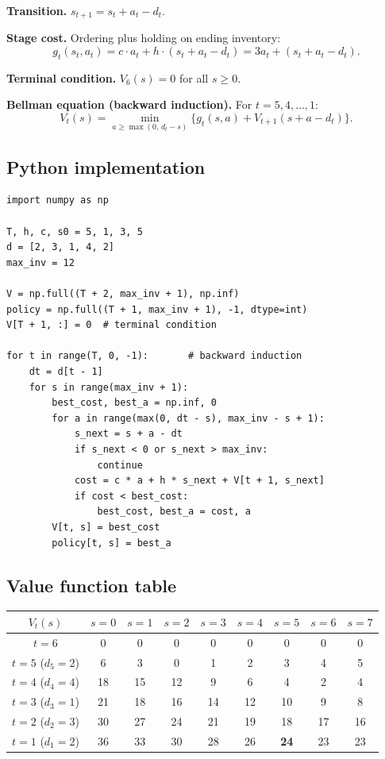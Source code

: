 \documentclass[12pt]{article}
\begin{document}
\textbf{Transition.} $s_{t+1} = s_t + a_t - d_t$.

\textbf{Stage cost.} Ordering plus holding on ending inventory:
\[
  g_t(s_t, a_t) = c \cdot a_t + h \cdot (s_t + a_t - d_t) = 3a_t + (s_t + a_t - d_t).
\]

\textbf{Terminal condition.} $V_6(s) = 0$ for all $s \geq 0$.

\textbf{Bellman equation (backward induction).} For $t = 5, 4, \ldots, 1$:
\[
  V_t(s) = \min_{a \geq \max(0,\, d_t - s)} \Big\{ g_t(s, a) + V_{t+1}(s + a - d_t) \Big\}.
\]

\subsection*{Python implementation}

\begin{lstlisting}
import numpy as np

T, h, c, s0 = 5, 1, 3, 5
d = [2, 3, 1, 4, 2]
max_inv = 12

V = np.full((T + 2, max_inv + 1), np.inf)
policy = np.full((T + 1, max_inv + 1), -1, dtype=int)
V[T + 1, :] = 0  # terminal condition

for t in range(T, 0, -1):       # backward induction
    dt = d[t - 1]
    for s in range(max_inv + 1):
        best_cost, best_a = np.inf, 0
        for a in range(max(0, dt - s), max_inv - s + 1):
            s_next = s + a - dt
            if s_next < 0 or s_next > max_inv:
                continue
            cost = c * a + h * s_next + V[t + 1, s_next]
            if cost < best_cost:
                best_cost, best_a = cost, a
        V[t, s] = best_cost
        policy[t, s] = best_a
\end{lstlisting}

\subsection*{Value function table}

\begin{center}
\renewcommand{\arraystretch}{1.15}
\begin{tabular}{c|cccccccc}
\toprule
$V_t(s)$ & $s=0$ & $s=1$ & $s=2$ & $s=3$ & $s=4$ & $s=5$ & $s=6$ & $s=7$ \\
\midrule
$t=6$ & 0  & 0  & 0  & 0  & 0  & 0  & 0  & 0 \\
$t=5$ ($d_5\!=\!2$) & 6  & 3  & 0  & 1  & 2  & 3  & 4  & 5 \\
$t=4$ ($d_4\!=\!4$) & 18 & 15 & 12 & 9  & 6  & 4  & 2  & 4 \\
$t=3$ ($d_3\!=\!1$) & 21 & 18 & 16 & 14 & 12 & 10 & 9  & 8 \\
$t=2$ ($d_2\!=\!3$) & 30 & 27 & 24 & 21 & 19 & 18 & 17 & 16 \\
$t=1$ ($d_1\!=\!2$) & 36 & 33 & 30 & 28 & 26 & \textbf{24} & 23 & 23 \\
\bottomrule
\end{tabular}
\end{center}
\end{document}
